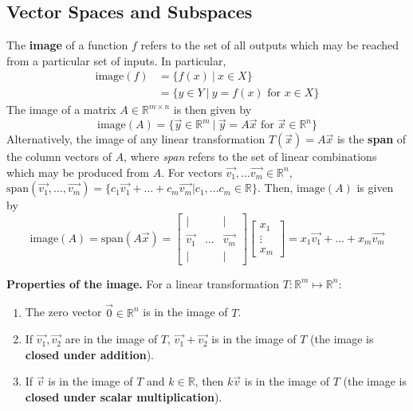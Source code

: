 \subsection{Vector Spaces and Subspaces}

The \textbf{image} of a function $f$ refers to the set of all outputs which may be reached from a particular set of inputs. In particular, 
\begin{align*}
\text{image}(f) &= \{f(x)\ |\ x\in X\}\\
&= \{y\in Y\ |\ y=f(x)\text{ for } x\in X\}
\end{align*}
The image of a matrix $A\in\mathbb{R}^{m\times n}$ is then given by \[\text{image}(A) = \{\vec{y}\in\mathbb{R}^m\ |\ \vec{y}=A\vec{x}\text{ for }\vec{x}\in\mathbb{R}^n\}\]
Alternatively, the image of any linear transformation $T(\vec{x}) = A\vec{x}$ is the \textbf{span} of the column vectors of $A$, where \textit{span} refers to the set of linear combinations which may be produced from $A$. For vectors $\vec{v_1}, \dots \vec{v_m}\in\mathbb{R}^n$, $\text{span}(\vec{v_1},\dots,\vec{v_m}) = \{c_1\vec{v_1} + \dots + c_m\vec{v_m}|c_1,\dots c_m\in\mathbb{R}\}$. Then, $\text{image}(A)$ is given by \[\text{image}(A) = \text{span}(A\vec{x}) = \begin{bmatrix}
    | & & |\\
    \vec{v_1} & \dots & \vec{v_m}\\
    | & & |
\end{bmatrix}\begin{bmatrix}
    x_1\\
    \vdots\\
    x_m
\end{bmatrix} = x_1\vec{v_1} + \dots + x_m\vec{v_m}\]
\vspace{-2em}
\begin{shaded}
    \textbf{Properties of the image.} For a linear transformation $T:\mathbb{R}^m\mapsto\mathbb{R}^n$:
    \begin{center}
        \begin{enumerate}
            \item The zero vector $\vec{0}\in\mathbb{R}^n$ is in the image of $T$.
            \item If $\vec{v_1},\vec{v_2}$ are in the image of $T$, $\vec{v_1}+\vec{v_2}$ is in the image of $T$ (the image is \textbf{closed under addition}).
            \item If $\vec{v}$ is in the image of $T$ and $k\in\mathbb{R}$, then $k\vec{v}$ is in the image of $T$ (the image is \textbf{closed under scalar multiplication}).
        \end{enumerate}
    \end{center}
\end{shaded}
